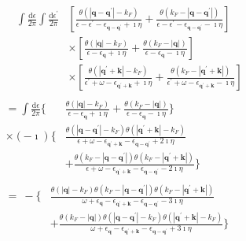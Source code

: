 \[ \begin{split}
&\quad \begin{split} \int \frac{\mathrm{d}\epsilon}{2\pi}\int \frac{\mathrm{d}\epsilon^{'}}{2\pi}
& \left[ \frac{\theta(|\mathbf{q}-\mathbf{q}^{'}|-k_F)}{\epsilon - \epsilon^{'}-\epsilon_{\mathbf{q}-\mathbf{q}^{'}}+\imath\eta} + \frac{\theta(k_F-|\mathbf{q}-\mathbf{q}^{'}|)}{\epsilon - \epsilon^{'}-\epsilon_{\mathbf{q}-\mathbf{q}^{'}}-\imath\eta} \right] \\
& \times \left[ \frac{\theta(|\mathbf{q}|-k_F)}{\epsilon -\epsilon_{\mathbf{q}}+\imath\eta} + \frac{\theta(k_F-|\mathbf{q}|)}{\epsilon -\epsilon_{\mathbf{q}}-\imath\eta} \right] \\
& \times \left[ \frac{\theta(|\mathbf{q}^{'}+\mathbf{k}|-k_F)}{\epsilon^{'}+\omega -\epsilon_{\mathbf{q}^{'}+\mathbf{k}}+\imath\eta} + \frac{\theta(k_F-|\mathbf{q}^{'}+\mathbf{k}|)}{\epsilon^{'}+\omega -\epsilon_{\mathbf{q}^{'}+\mathbf{k}}-\imath\eta} \right]
\end{split}
\\
& \begin{split}=
\int \frac{\mathrm{d}\epsilon}{2\pi} \{ & \frac{\theta(|\mathbf{q}|-k_F)}{\epsilon -\epsilon_{\mathbf{q}}+\imath\eta} + \frac{\theta(k_F-|\mathbf{q}|)}{\epsilon -\epsilon_{\mathbf{q}}-\imath\eta} \} \\
\times(-\imath)\{ & \frac{\theta(|\mathbf{q}-\mathbf{q}^{'}|-k_F)\theta(|\mathbf{q}^{'}+\mathbf{k}|-k_F)}{\epsilon + \omega - \epsilon_{\mathbf{q}^{'}+\mathbf{k}} - \epsilon_{\mathbf{q}-\mathbf{q}^{'}} + 2 \imath \eta }\\
&+\frac{\theta(k_F-|\mathbf{q}-\mathbf{q}^{'}|)\theta(k_F-|\mathbf{q}^{'}+\mathbf{k}|)}{\epsilon + \omega - \epsilon_{\mathbf{q}^{'}+\mathbf{k}} - \epsilon_{\mathbf{q}-\mathbf{q}^{'}} - 2 \imath \eta }
\}
\end{split}\\
& \begin{split}=  \ - \{&
\frac{\theta(|\mathbf{q}|-k_F)\theta(k_F-|\mathbf{q}-\mathbf{q}^{'}|)\theta(k_F-|\mathbf{q}^{'}+\mathbf{k}|)}{\omega+\epsilon_{\mathbf{q}} - \epsilon_{\mathbf{q}^{'}+\mathbf{k}}-\epsilon_{\mathbf{q}-\mathbf{q}^{'}}-3\imath \eta}\\
&+\frac{\theta(k_F-|\mathbf{q}|)\theta(|\mathbf{q}-\mathbf{q}^{'}|-k_F)\theta(|\mathbf{q}^{'}+\mathbf{k}|-k_F)}{\omega+\epsilon_{\mathbf{q}} - \epsilon_{\mathbf{q}^{'}+\mathbf{k}}-\epsilon_{\mathbf{q}-\mathbf{q}^{'}}+3\imath \eta} \} \end{split}
\end{split} \]

